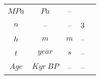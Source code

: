 \documentclass[a4paper,11pt]{article}
\begin{document}
\begin{longtable}{|c|c|c|c|c|}
\begin{math} MPa \end{math} &
\begin{math} Pa \end{math} &
-- & \\
\cline{1-4}
\begin{math}n\end{math} &
-- &
-- &
3& \\
\cline{1-4}
\begin{math} h \end{math} &
\begin{math} m \end{math} &
\begin{math} m \end{math} &
-- & \\
\cline{1-4}
\begin{math} t \end{math} &
\begin{math} year \end{math} &
\begin{math} s \end{math} &
-- & \\
\cline{1-4}
\begin{math} Age \end{math} &
\begin{math} Kyr \: B P \end{math} &
-- &
-- & \\


\end{longtable}
\end{document}
